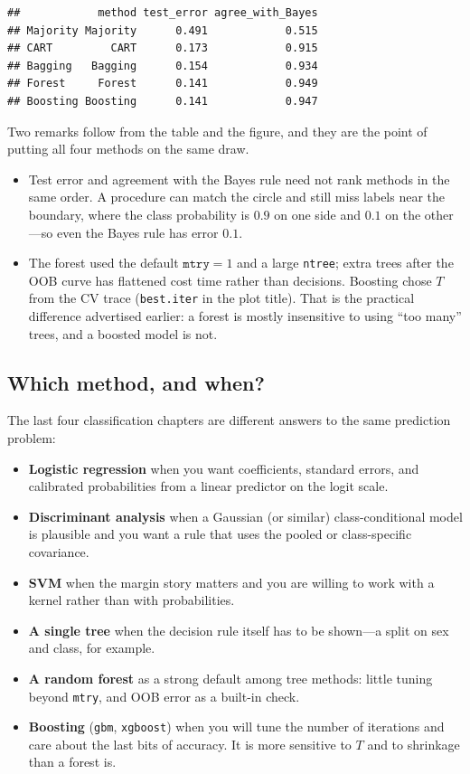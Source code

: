 \documentclass[
]{book}
\providecommand{\tightlist}{%
  \setlength{\itemsep}{0pt}\setlength{\parskip}{0pt}}
\begin{document}
\begin{verbatim}
##            method test_error agree_with_Bayes
## Majority Majority      0.491            0.515
## CART         CART      0.173            0.915
## Bagging   Bagging      0.154            0.934
## Forest     Forest      0.141            0.949
## Boosting Boosting      0.141            0.947
\end{verbatim}

Two remarks follow from the table and the figure, and they are the point of putting all four methods on the same draw.

\begin{itemize}
\tightlist
\item
  Test error and agreement with the Bayes rule need not rank methods in the same order. A procedure can match the circle and still miss labels near the boundary, where the class probability is \(0.9\) on one side and \(0.1\) on the other---so even the Bayes rule has error \(0.1\).
\item
  The forest used the default \(\texttt{mtry}=1\) and a large \texttt{ntree}; extra trees after the OOB curve has flattened cost time rather than decisions. Boosting chose \(T\) from the CV trace (\texttt{best.iter} in the plot title). That is the practical difference advertised earlier: a forest is mostly insensitive to using ``too many'' trees, and a boosted model is not.
\end{itemize}

\vspace{1.2em}

\subsection*{Which method, and when?}\label{which-method-and-when}

The last four classification chapters are different answers to the same prediction problem:

\begin{itemize}
\tightlist
\item
  \textbf{Logistic regression} when you want coefficients, standard errors, and calibrated probabilities from a linear predictor on the logit scale.
\item
  \textbf{Discriminant analysis} when a Gaussian (or similar) class-conditional model is plausible and you want a rule that uses the pooled or class-specific covariance.
\item
  \textbf{SVM} when the margin story matters and you are willing to work with a kernel rather than with probabilities.
\item
  \textbf{A single tree} when the decision rule itself has to be shown---a split on sex and class, for example.
\item
  \textbf{A random forest} as a strong default among tree methods: little tuning beyond \texttt{mtry}, and OOB error as a built-in check.
\item
  \textbf{Boosting} (\texttt{gbm}, \texttt{xgboost}) when you will tune the number of iterations and care about the last bits of accuracy. It is more sensitive to \(T\) and to shrinkage than a forest is.
\end{itemize}
\end{document}
